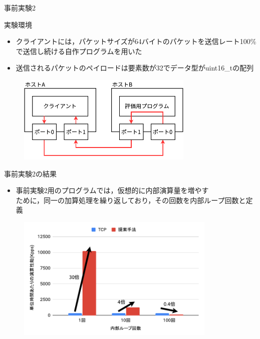 \documentclass[12pt, unicode]{beamer}
\begin{document}
\begin{frame}{事前実験2}
  \begin{block}{実験環境}
    \begin{itemize}
      \item クライアントには，パケットサイズが64バイトのパケットを送信レート100\%で送信し続ける自作プログラムを用いた
      \item 送信されるパケットのペイロードは要素数が32でデータ型がuint16\_tの配列
    \end{itemize}
  \end{block}

  \begin{figure}[h]
    \centering
    \includegraphics[width=0.75\textwidth]{pictures/PreExperimentNetwork.pdf}
  \end{figure}
\end{frame}

\begin{frame}{事前実験2の結果}
  \begin{itemize}
    \item 事前実験2用のプログラムでは，仮想的に内部演算量を増やす\\ために，同一の加算処理を繰り返しており，その回数を内部ループ回数と定義
  \end{itemize}

  \begin{figure}[h]
    \centering
    \includegraphics[width=0.85\textwidth]{pictures/PreExperimentTwoResult.pdf}
  \end{figure}
\end{frame}
\end{document}
